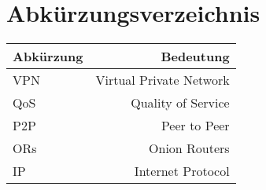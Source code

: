 \section{Abkürzungsverzeichnis}

\begin{tabular}{l|r}
    Abkürzung & Bedeutung \\
    \hline
    VPN & Virtual Private Network \\
    QoS & Quality of Service \\
    P2P & Peer to Peer \\
    ORs & Onion Routers \\
    IP & Internet Protocol \\
\end{tabular}